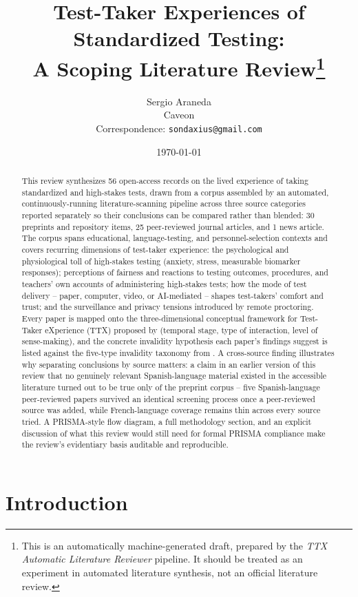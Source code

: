 \documentclass[11pt]{article}
\title{Test-Taker Experiences of Standardized Testing:\\ A Scoping Literature Review\thanks{This is an automatically machine-generated draft, prepared by the \emph{TTX Automatic Literature Reviewer} pipeline. It should be treated as an experiment in automated literature synthesis, not an official literature review.}}
\author{Sergio Araneda \\ Caveon \\ Correspondence: \texttt{sondaxius@gmail.com}}
\date{\today}
\begin{document}
\maketitle

\begin{abstract}
\noindent This review synthesizes 56 open-access records on the lived experience of taking standardized and high-stakes tests, drawn from a corpus assembled by an automated, continuously-running literature-scanning pipeline across three source categories reported separately so their conclusions can be compared rather than blended: 30 preprints and repository items, 25 peer-reviewed journal articles, and 1 news article. The corpus spans educational, language-testing, and personnel-selection contexts and covers recurring dimensions of test-taker experience: the psychological and physiological toll of high-stakes testing (anxiety, stress, measurable biomarker responses); perceptions of fairness and reactions to testing outcomes, procedures, and teachers' own accounts of administering high-stakes tests; how the mode of test delivery -- paper, computer, video, or AI-mediated -- shapes test-takers' comfort and trust; and the surveillance and privacy tensions introduced by remote proctoring. Every paper is mapped onto the three-dimensional conceptual framework for Test-Taker eXperience (TTX) proposed by \citet{araneda2025ttxmodel} (temporal stage, type of interaction, level of sense-making), and the concrete invalidity hypothesis each paper's findings suggest is listed against the five-type invalidity taxonomy from \citet{araneda2023dissertation}. A cross-source finding illustrates why separating conclusions by source matters: a claim in an earlier version of this review that no genuinely relevant Spanish-language material existed in the accessible literature turned out to be true only of the preprint corpus -- five Spanish-language peer-reviewed papers survived an identical screening process once a peer-reviewed source was added, while French-language coverage remains thin across every source tried. A PRISMA-style flow diagram, a full methodology section, and an explicit discussion of what this review would still need for formal PRISMA compliance make the review's evidentiary basis auditable and reproducible.
\end{abstract}

\section{Introduction}
\end{document}
